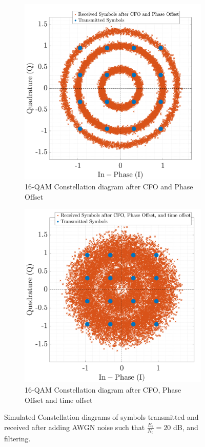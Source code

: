 \documentclass[11pt]{article}
\begin{document}
	\begin{figure}[H]
		\centering
		\begin{subfigure}[b]{0.48\textwidth}
			\centering
			\includegraphics[width=\linewidth]{cfo-po}
			\caption{16-QAM Constellation diagram after CFO and Phase Offset}
			\label{fig:cfo-po-sub}
		\end{subfigure}
		\hfill 
		\begin{subfigure}[b]{0.48\textwidth}
			\centering
			\includegraphics[width=\linewidth]{cfo-po-to}
			\caption{16-QAM Constellation diagram after CFO, Phase Offset and time offset}
			\label{fig:cfo-po-to-sub}
		\end{subfigure}
		\caption{Simulated Constellation diagrams of symbols transmitted and received after adding AWGN noise such that $\frac{E_b}{N_0} = 20$ dB, and filtering.}
		\label{fig:cfo-combined}
	\end{figure}
	
\end{document}
